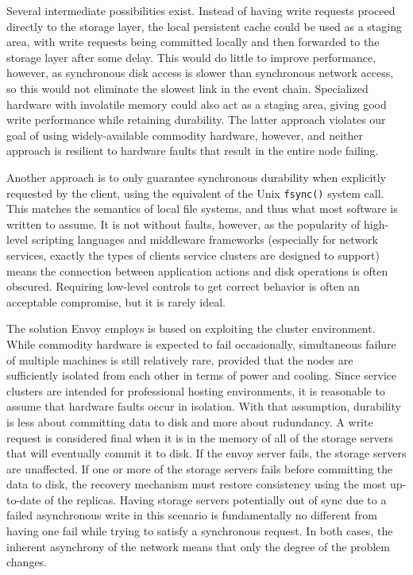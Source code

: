 Several intermediate possibilities exist. Instead of having write requests proceed directly to the storage layer, the local persistent cache could be used as a staging area, with write requests being committed locally and then forwarded to the storage layer after some delay. This would do little to improve performance, however, as synchronous disk access is slower than synchronous network access, so this would not eliminate the slowest link in the event chain. Specialized hardware with involatile memory could also act as a staging area, giving good write performance while retaining durability. The latter approach violates our goal of using widely-available commodity hardware, however, and neither approach is resilient to hardware faults that result in the entire node failing.

Another approach is to only guarantee synchronous durability when explicitly requested by the client, using the equivalent of the Unix \texttt{fsync()} system call. This matches the semantics of local file systems, and thus what most software is written to assume. It is not without faults, however, as the popularity of high-level scripting languages and middleware frameworks (especially for network services, exactly the types of clients service clusters are designed to support) means the connection between application actions and disk operations is often obscured. Requiring low-level controls to get correct behavior is often an acceptable compromise, but it is rarely ideal.

The solution Envoy employs is based on exploiting the cluster environment. While commodity hardware is expected to fail occasionally, simultaneous failure of multiple machines is still relatively rare, provided that the nodes are sufficiently isolated from each other in terms of power and cooling. Since service clusters are intended for professional hosting environments, it is reasonable to assume that hardware faults occur in isolation. With that assumption, durability is less about committing data to disk and more about rudundancy. A write request is considered final when it is in the memory of all of the storage servers that will eventually commit it to disk. If the envoy server fails, the storage servers are unaffected. If one or more of the storage servers fails before committing the data to disk, the recovery mechanism must restore consistency using the most up-to-date of the replicas. Having storage servers potentially out of sync due to a failed asynchronous write in this scenario is fundamentally no different from having one fail while trying to satisfy a synchronous request. In both cases, the inherent asynchrony of the network means that only the degree of the problem changes.

